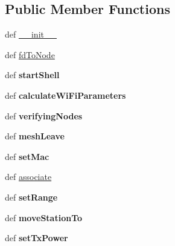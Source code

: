 \subsection*{Public Member Functions}
\begin{DoxyCompactItemize}
\item 
def \hyperlink{classmininet_1_1node_1_1Node_ae565010f2b329ac47a215ff588c483d7}{\-\_\-\-\_\-init\-\_\-\-\_\-}
\item 
def \hyperlink{classmininet_1_1node_1_1Node_ada863d2ab5219890fa1b434c7c8b90fe}{fd\-To\-Node}
\item 
\hypertarget{classmininet_1_1node_1_1Node_a69d6e6cad45d1384c16dae11e955c4b0}{def {\bfseries start\-Shell}}\label{classmininet_1_1node_1_1Node_a69d6e6cad45d1384c16dae11e955c4b0}

\item 
\hypertarget{classmininet_1_1node_1_1Node_a74b98f8d61c2b9692a9f3bb2b8defda1}{def {\bfseries calculate\-Wi\-Fi\-Parameters}}\label{classmininet_1_1node_1_1Node_a74b98f8d61c2b9692a9f3bb2b8defda1}

\item 
\hypertarget{classmininet_1_1node_1_1Node_acc4447c65d4915ce8ee0de9a8e73fe54}{def {\bfseries verifying\-Nodes}}\label{classmininet_1_1node_1_1Node_acc4447c65d4915ce8ee0de9a8e73fe54}

\item 
\hypertarget{classmininet_1_1node_1_1Node_a55298f4081afd902b9a237a004557474}{def {\bfseries mesh\-Leave}}\label{classmininet_1_1node_1_1Node_a55298f4081afd902b9a237a004557474}

\item 
\hypertarget{classmininet_1_1node_1_1Node_a1c8c1fc2623626762ed5407ac735e95e}{def {\bfseries set\-Mac}}\label{classmininet_1_1node_1_1Node_a1c8c1fc2623626762ed5407ac735e95e}

\item 
def \hyperlink{classmininet_1_1node_1_1Node_af93cd2057518eabbcaa89f413ba8af13}{associate}
\item 
\hypertarget{classmininet_1_1node_1_1Node_a1bee3bd5ce51622b15b2b3e912f997cd}{def {\bfseries set\-Range}}\label{classmininet_1_1node_1_1Node_a1bee3bd5ce51622b15b2b3e912f997cd}

\item 
\hypertarget{classmininet_1_1node_1_1Node_afe66e20f3d474dd0ad757830dbff09fb}{def {\bfseries move\-Station\-To}}\label{classmininet_1_1node_1_1Node_afe66e20f3d474dd0ad757830dbff09fb}

\item 
\hypertarget{classmininet_1_1node_1_1Node_a0727ff588006ffb3ba0bde2a856325a5}{def {\bfseries set\-Tx\-Power}}\label{classmininet_1_1node_1_1Node_a0727ff588006ffb3ba0bde2a856325a5}


\end{DoxyCompactItemize}
